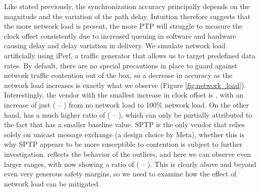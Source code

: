 Like stated previously, the synchronization accuracy principally depends on the magnitude and the variation of the path delay. Intuition therefore suggests that the more network load is present, the more PTP will struggle to measure the clock offset consistently due to increased queuing in software and hardware causing delay and delay variation in delivery. We simulate network load artificially using iPerf, a traffic generator that allows us to target predefined data rates. By default, there are no special precautions in place to guard against network traffic contention out of the box, so a decrease in accuracy as the network load increases is exactly what we observe (Figure \ref{fig:network_load}). Interestingly, the vendor with the smallest increase in clock offset is \fVendor{\cmpMinArg}, with an increase of just \fRatio[1]{\cmpMin} ( -- ) from no network load to 100\% network load. On the other hand, \fVendor{\cmpMaxArg} has a much higher ratio of \fRatio{\cmpMax} ( -- ), which can only be partially attributed to the fact that \fVendor{\cmpMaxArg} has a smaller baseline value.
%
SPTP is the only vendor that relies solely on unicast message exchange (a design choice by Meta), whether this is why SPTP appears to be more susceptible to contention is subject to further investigation.%
%
%
\PNineFive{} reflects the behavior of the outliers, and here we can observe even larger ranges, with \fVendor{\cmpMaxArg} now showing a ratio of \fRatio[-1]{\cmpMax} ( -- ). This is clearly above and beyond even very generous safety margins, so we need to examine how the effect of network load can be mitigated.

